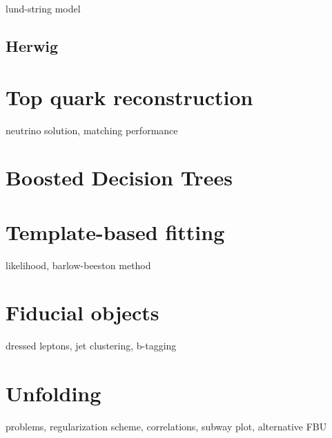 lund-string model

\subsection{Herwig}

\section{Top quark reconstruction}

neutrino solution, matching performance

\section{Boosted Decision Trees}
\cite{Hocker:2007ht}


\section{Template-based fitting}

likelihood, barlow-beeston method

\section{Fiducial objects}

dressed leptons, jet clustering, b-tagging

\section{Unfolding}

problems, regularization scheme, correlations, subway plot, alternative FBU
